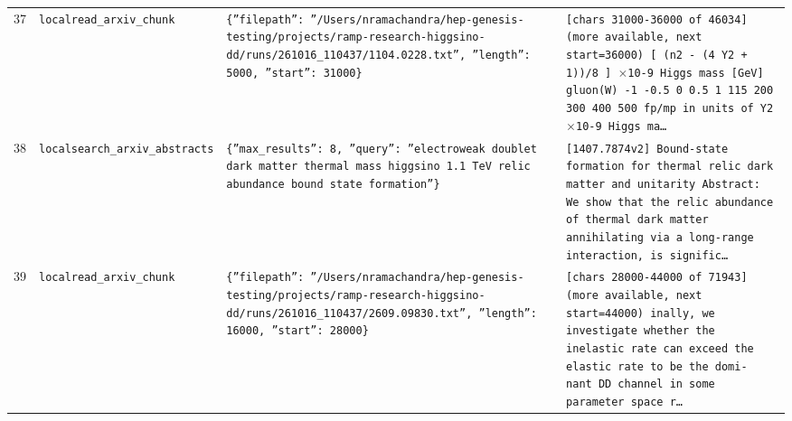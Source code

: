 \documentclass[11pt,a4paper]{article}
\begin{document}
\begin{longtable}{@{}p{}p{}p{}p{}@{}}
37 & \texttt{local}\newline\texttt{read\_\allowbreak{}arxiv\_\allowbreak{}chunk} & \texttt{\{''filepath'':\allowbreak{} ''/\allowbreak{}Users/\allowbreak{}nramachandra/\allowbreak{}hep-genesis-testing/\allowbreak{}projects/\allowbreak{}ramp-research-higgsino-dd/\allowbreak{}runs/\allowbreak{}261016\_\allowbreak{}110437/\allowbreak{}1104.0228.txt'',\allowbreak{} ''length'':\allowbreak{} 5000,\allowbreak{} ''start'':\allowbreak{} 31000\}\allowbreak{}} & \texttt{[chars 31000-36000 of 46034]\allowbreak{} (more available,\allowbreak{} next start=\allowbreak{}36000)\allowbreak{}  [ (n2 - (4 Y2 + 1)\allowbreak{})\allowbreak{}/\allowbreak{}8 ]\allowbreak{} $\times$10-9 Higgs mass [GeV]\allowbreak{} gluon(W)\allowbreak{} -1 -0.5  0  0.5  1  115  200  300  400  500 fp/\allowbreak{}mp in units of Y2 $\times$10-9 Higgs ma\ldots{}\allowbreak{}} \\
38 & \texttt{local}\newline\texttt{search\_\allowbreak{}arxiv\_\allowbreak{}abstracts} & \texttt{\{''max\_\allowbreak{}results'':\allowbreak{} 8,\allowbreak{} ''query'':\allowbreak{} ''electroweak doublet dark matter thermal mass higgsino 1.1 TeV relic abundance bound state formation''\}\allowbreak{}} & \texttt{[1407.7874v2]\allowbreak{} Bound-state formation for thermal relic dark matter and unitarity Abstract:\allowbreak{} We show that the relic abundance of thermal dark matter annihilating via a long-range interaction,\allowbreak{} is signific\ldots{}\allowbreak{}} \\
39 & \texttt{local}\newline\texttt{read\_\allowbreak{}arxiv\_\allowbreak{}chunk} & \texttt{\{''filepath'':\allowbreak{} ''/\allowbreak{}Users/\allowbreak{}nramachandra/\allowbreak{}hep-genesis-testing/\allowbreak{}projects/\allowbreak{}ramp-research-higgsino-dd/\allowbreak{}runs/\allowbreak{}261016\_\allowbreak{}110437/\allowbreak{}2609.09830.txt'',\allowbreak{} ''length'':\allowbreak{} 16000,\allowbreak{} ''start'':\allowbreak{} 28000\}\allowbreak{}} & \texttt{[chars 28000-44000 of 71943]\allowbreak{} (more available,\allowbreak{} next start=\allowbreak{}44000)\allowbreak{}  inally,\allowbreak{} we investigate whether the inelastic rate can exceed the elastic rate to be the domi- nant DD channel in some parameter space r\ldots{}\allowbreak{}} \\

\end{longtable}
\end{document}
